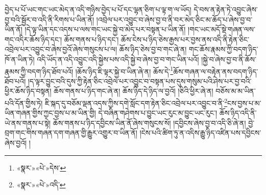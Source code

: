 བྱེད་པ་པོ་ཡང་གང་ཡང་མེད་ན་འདི་གཉིས་བྱེད་པ་པོ་དང་ལྷན་ཅིག་པ་ལྟ་ག་ལ་ཡོད། དེ་བས་ན་རྟེན་ཏེ་འབྱུང་ཞེས་བྱ་བའི་སྦྱོར་བ་འདི་ནི་རིགས་པ་ཡིན་ནོ། །འབྲེལ་པར་འབྱུང་བ་ཞེས་བྱ་བ་ནི་བར་མེད་ཅིང་མ་ཆོད་པ་ཞེས་བྱ་བ་ཡིན་ནོ། །དེ་ལྟ་ཡིན་དང་འདས་པ་ལས་གང་ཡང་སྐྱེ་བ་མེད་པར་བསྟན་པ་ཡིན་ནོ། །གང་ཡང་མདོ་སྡེ་གཞན་ལས་གང་འདིར་ཆོས་ཉིད་དང་། ཆོས་གནས་པ་ཉིད་དང་། ཆོས་ངེས་པ་ཉིད་ཅེས་རྒྱས་པར་བྱས་ནས་འདི་ནི་རྟེན་ཅིང་འབྲེལ་པར་འབྱུང་བ་ཞེས་བྱའོ་ཞེས་གསུངས་པ་ལ། ཆོས་ཉིད་ཅེས་བྱ་བ་གང་ཞེ་ན། གང་ཆོས་རྣམས་ཀྱི་བདག་ཉིད་ཁོ་ན་ཡིན་ཏེ། འདི་ཡོད་ན་འདི་འབྱུང་འདི་སྐྱེས་པས་འདི་སྐྱེ་བ་ཞེས་བྱ་བ་གང་ཡིན་པའོ། །སྐྱེ་བ་ཞེས་བྱ་བ་ནི་ཆོས་རྣམས་ཀྱི་བདག་ཉིད་ཐོབ་པའོ། །ཆོས་ཉིད་ཇི་ལྟར་སྐྱེ་བ་ཡིན་ཞེ་ན། ཆོས་དེ་\footnote{«སྣར་»«པེ་»དེས་}ཆོས་གཞན་ལ་བརྟེན་ནས་བདག་ཉིད་ཐོབ་པའོ། །ད་ལྟར་བྱུང་བའི་དུས་ཀྱི་རྟེན་ཅིང་འབྲེལ་པར་འབྱུང་བ་བསྟན་པས་དུས་གསུམ་པའི་ཤེས་པར་བྱ་བའི་ཕྱིར་ཆོས་ཉིད་བསྟན། ཆོས་གནས་པ་ཉིད་གང་ཞེ་ན། ཆོས་ཉིད་དེ་ཉིད་ལ་བྱའོ། །ཅིའི་ཕྱིར་ཞེ་ན། བཅོས་མ་མ་ཡིན་པའི་དོན་གྱིས་ཏེ། ཇི་སྐད་དུ་བཅོམ་ལྡན་འདས་ཀྱིས་དགེ་སློང་དག་རྟེན་ཅིང་འབྲེལ་པར་འབྱུང་བ་ནི་\footnote{«སྣར་»«པེ་»འདི་}ངས་བྱས་པ་མ་ཡིན་གཞན་གྱིས་ཀྱང་བྱས་པ་མ་ཡིན་གྱི། དེ་བཞིན་གཤེགས་པ་བྱུང་ཡང་རུང་མ་བྱུང་ཡང་རུང་། ཆོས་ཉིད་འདི་ནི་ཡེ་ནས་གནས་པ་སྟེ། ཆོས་གནས་པ་ཉིད་དབྱིངས་ཡིན་ནོ་ཞེས་གསུངས་སོ། །དབྱིངས་ཞེས་བྱ་བ་འདི་ཅི་ཞེ་ན། བྱེ་བྲག་གང་གིས་གཞན་དག་གཞན་གྱི་རྒྱུར་འགྱུར་བ་ཡིན་ནོ། །ངེས་པའི་ཚིག་ཏུ་ན་འདིས་རྒྱུ་ཉིད་འཛིན་པས་དབྱིངས་ཞེས་བྱའོ། །
